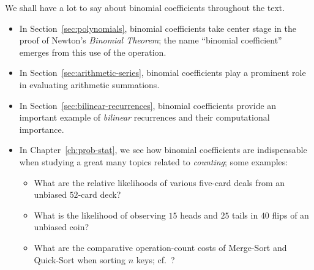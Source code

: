 \noindent
We shall have a lot to say about binomial coefficients throughout the text.
\begin{itemize}
\item
In Section~\ref{sec:polynomials}, binomial coefficients take center stage in the proof of Newton's {\it Binomial Theorem}; the name ``binomial coefficient'' emerges from this use of the operation.
\medskip\item
In Section~\ref{sec:arithmetic-series}, binomial coefficients play a prominent role in evaluating arithmetic summations.
\medskip\item
In Section~\ref{sec:bilinear-recurrences}, binomial coefficients provide an important example of {\em bilinear} recurrences and their computational importance.
\medskip\item
In Chapter~\ref{ch:prob-stat}, we see how binomial coefficients are indispensable when studying a great many topics related to {\em counting}; some examples:
  \begin{itemize}
  \item
What are the relative likelihoods of various five-card deals from an unbiased $52$-card deck?
  \medskip\item
What is the likelihood of observing $15$ {\sc head}s and $25$ {\sc tail}s in $40$ flips of an unbiased coin?
  \medskip\item
What are the comparative operation-count costs of Merge-Sort and Quick-Sort when sorting $n$ keys; cf.~\cite{CLRS}?
  \end{itemize}
\end{itemize}

 

